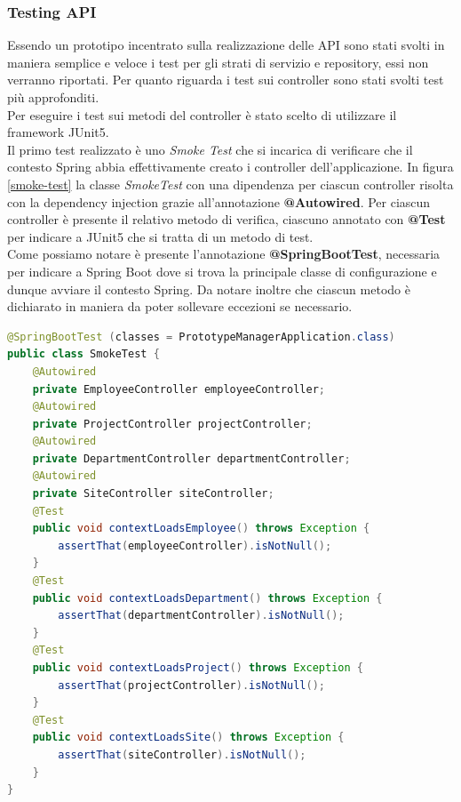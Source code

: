 \subsubsection*{Testing API}
Essendo un prototipo incentrato sulla realizzazione delle API sono stati svolti in maniera semplice e veloce i test per gli strati di servizio e repository, essi non verranno riportati. Per quanto riguarda i test sui controller sono stati svolti test più approfonditi.\\
Per eseguire i test sui metodi del controller è stato scelto di utilizzare il framework JUnit5.\\
Il primo test realizzato è uno \textit{Smoke Test} che si incarica di verificare che il contesto Spring abbia effettivamente creato i controller dell'applicazione. In figura \ref{smoke-test} la classe \textit{SmokeTest} con una dipendenza per ciascun controller risolta con la dependency injection grazie all'annotazione \textbf{@Autowired}. Per ciascun controller è presente il relativo metodo di verifica, ciascuno annotato con \textbf{@Test} per indicare a JUnit5 che si tratta di un metodo di test.\\
Come possiamo notare è presente l'annotazione \textbf{@SpringBootTest}, necessaria per indicare a Spring Boot dove si trova la principale classe di configurazione e dunque avviare il contesto Spring. Da notare inoltre che ciascun metodo è dichiarato in maniera da poter sollevare eccezioni se necessario.
\begin{lstlisting}[language=Java, title={SmokeTest.java}, morecomment={[s][\color{DarkOrchid}]{@}{\ }},  morecomment={[s][\color{OliveGreen}]{"}{"}},]
@SpringBootTest (classes = PrototypeManagerApplication.class)
public class SmokeTest {
    @Autowired
    private EmployeeController employeeController;
    @Autowired
    private ProjectController projectController;
    @Autowired
    private DepartmentController departmentController;
    @Autowired
    private SiteController siteController;
    @Test
    public void contextLoadsEmployee() throws Exception {
        assertThat(employeeController).isNotNull();
    }
    @Test
    public void contextLoadsDepartment() throws Exception {
        assertThat(departmentController).isNotNull();
    }
    @Test
    public void contextLoadsProject() throws Exception {
        assertThat(projectController).isNotNull();
    }
    @Test
    public void contextLoadsSite() throws Exception {
        assertThat(siteController).isNotNull();
    }
}
\end{lstlisting}
